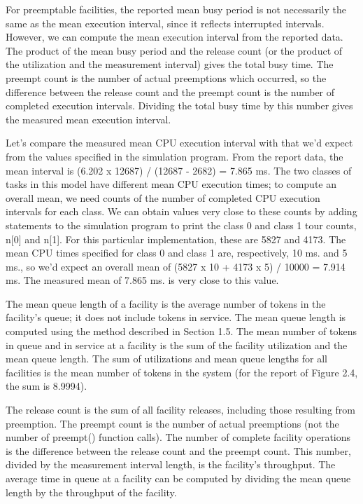 For preemptable facilities, the reported mean busy period is not necessarily
 the same as the mean execution interval, since it reflects interrupted
intervals. However, we can compute the mean execution interval from the
reported data. The product of the mean busy period and the release count (or
 the product of the utilization and the measurement interval) gives the total
busy time. The preempt count is the number of actual preemptions which
occurred, so the difference between the release count and the preempt count
is the number of completed execution intervals. Dividing the total busy time by
this number gives the measured mean execution interval.

Let's compare the measured mean CPU execution interval with that we'd expect
from the values specified in the simulation program. From the report data, the
mean interval is (6.202 x 12687) / (12687 - 2682) = 7.865 ms. The two classes
of tasks in this model have different mean CPU execution times; to compute an
overall mean, we need counts of the number of completed CPU execution
intervals for each class. We can obtain values very close to these counts by
adding statements to the simulation program to print the class 0 and class 1
tour counts, n[0] and n[1]. For this particular implementation, these are 5827
and 4173. The mean CPU times specified for class 0 and class 1 are,
respectively, 10 ms. and 5 ms., so we'd expect an overall mean of
(5827 x 10 + 4173 x 5) / 10000 = 7.914 ms. The measured mean of 7.865 ms. is
very close to this value.

The mean queue length of a facility is the average number of tokens in the
facility's queue; it does not include tokens in service. The mean queue length
is computed using the method described in Section 1.5. The mean number of
tokens in queue and in service at a facility is the sum of the facility
utilization and the mean queue length. The sum of utilizations and mean queue
lengths for all facilities is the mean number of tokens in the system (for the
report of Figure 2.4, the sum is 8.9994).

The release count is the sum of all facility releases, including those
resulting from preemption. The preempt count is the number of actual
preemptions (not the number of preempt() function calls). The number of
complete facility operations is the difference between the release count and
the preempt count. This number, divided by the measurement interval length,
is the facility's throughput. The average time in queue at a facility can be
computed by dividing the mean queue length by the throughput of the facility.

